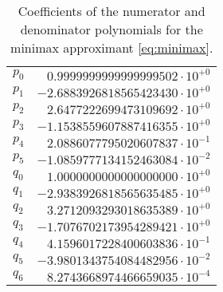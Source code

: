 \documentclass[10pt,DIV16,twocolumn,numbers=noenddot]{scrartcl}
\begin{document}
\begin{table}[t]
  \centering
  \caption{Coefficients of the numerator and denominator polynomials
    for the minimax approximant \eqref{eq:minimax}.}
  \begin{tabular}{lr}
    \toprule
    $p_0$ & $ 0.9999999999999999502\cdot 10^{+0}$ \\
    $p_1$ & $-2.6883926818565423430\cdot 10^{+0}$ \\
    $p_2$ & $ 2.6477222699473109692\cdot 10^{+0}$ \\
    $p_3$ & $-1.1538559607887416355\cdot 10^{+0}$ \\
    $p_4$ & $ 2.0886077795020607837\cdot 10^{-1}$ \\
    $p_5$ & $-1.0859777134152463084\cdot 10^{-2}$ \\
    $q_0$ & $ 1.0000000000000000000\cdot 10^{+0}$ \\
    $q_1$ & $-2.9383926818565635485\cdot 10^{+0}$ \\
    $q_2$ & $ 3.2712093293018635389\cdot 10^{+0}$ \\
    $q_3$ & $-1.7076702173954289421\cdot 10^{+0}$ \\
    $q_4$ & $ 4.1596017228400603836\cdot 10^{-1}$ \\
    $q_5$ & $-3.9801343754084482956\cdot 10^{-2}$ \\
    $q_6$ & $ 8.2743668974466659035\cdot 10^{-4}$ \\
    \bottomrule
  \end{tabular}
  \label{tab:coeffs}
\end{table}
\end{document}

